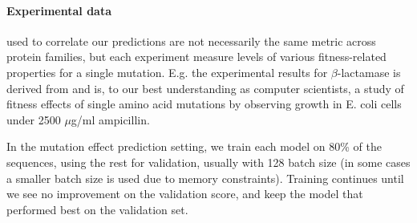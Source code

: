 \paragraph{Experimental data} used to correlate our predictions are not necessarily the same metric across protein families, but each experiment measure levels of various fitness-related properties for a single mutation. E.g. the experimental results for $\beta$-lactamase is derived from \textcite{stiffler2015evolvability} and is, to our best understanding as computer scientists, a study of fitness effects of single amino acid mutations by observing growth in E. coli cells under 2500 $\mu$g/ml ampicillin. 

In the mutation effect prediction setting, we train each model on 80\% of the sequences, using the rest for validation, usually with 128 batch size (in some cases a smaller batch size is used due to memory constraints). Training continues until we see no improvement on the validation score, and keep the model that performed best on the validation set.



